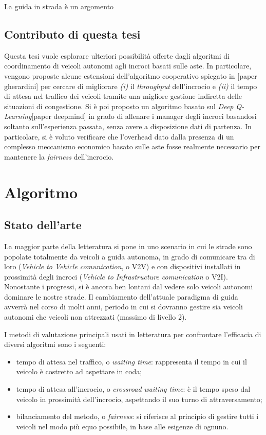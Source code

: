 \documentclass[letterpaper, 12pt]{article}
\begin{document}
La guida in strada è un argomento 

\subsection{Contributo di questa tesi}
\label{sec:org351bbf2}
Questa tesi vuole esplorare ulteriori possibilità offerte dagli algoritmi
di coordinamento di veicoli autonomi agli incroci basati sulle aste.
In particolare, vengono proposte alcune estensioni dell'algoritmo
cooperativo spiegato in [paper gherardini] per cercare di migliorare
\emph{(i)} il \emph{throughput} dell'incrocio e \emph{(ii)} il tempo di attesa nel 
traffico dei veicoli tramite una migliore gestione indiretta delle situazioni
di congestione.
Si è poi proposto un algoritmo basato sul \emph{Deep Q-Learning}[paper deepmind]
in grado di allenare i manager degli incroci basandosi soltanto sull'esperienza
passata, senza avere a disposizione dati di partenza.
In particolare, si è voluto verificare che l'overhead dato dalla presenza di 
un complesso meccanismo economico basato sulle aste fosse realmente necessario per mantenere
la \emph{fairness} dell'incrocio.
\newpage
\section{Algoritmo}
\label{sec:org11a2627}
\subsection{Stato dell'arte}
\label{sec:orgb57adcf}
La maggior parte della letteratura si pone in uno scenario in cui 
le strade sono popolate totalmente da veicoli a guida autonoma,
in grado di comunicare tra di loro (\emph{Vehicle to Vehicle comunication}, o V2V)
e con dispositivi installati in prossimità degli incroci
(\emph{Vehicle to Infrastructure comunication} o V2I).
Nonostante i progressi, si è ancora ben lontani dal vedere solo veicoli
autonomi dominare le nostre strade. Il cambiamento dell'attuale paradigma
di guida avverrà nel corso di molti anni, periodo in cui si dovranno gestire
sia veicoli autonomi che veicoli non attrezzati (massimo di livello 2).

I metodi di valutazione principali usati in letteratura per confrontare
l'efficacia di diversi algoritmi sono i seguenti:
\begin{itemize}
\item tempo di attesa nel traffico, o \emph{waiting time}: rappresenta il tempo
in cui il veicolo è costretto ad aspettare in coda;
\item tempo di attesa all'incrocio, o \emph{crossroad waiting time}: è il tempo
speso dal veicolo in prossimità dell'incrocio, aspettando il suo turno
di attraversamento;
\item bilanciamento del metodo, o \emph{fairness}: si riferisce al principio 
di gestire tutti i veicoli nel modo più equo possibile, in base
alle esigenze di ognuno.
\end{itemize}
\end{document}
